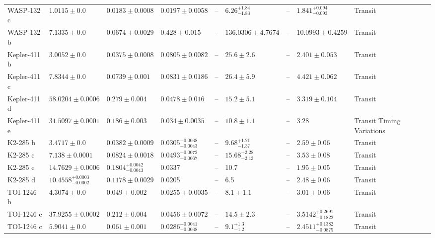 \begin{tabular}{llllllllll}
WASP-132 c & $1.0115 \pm 0.0$ & $0.0183 \pm 0.0008$ & $0.0197 \pm 0.0058$ & -- & $6.26^{+1.84}_{-1.83}$ & -- & $1.841^{+0.094}_{-0.093}$ & Transit & \cite{GRIEVES_ET_AL__2025} \\
WASP-132 b & $7.1335 \pm 0.0$ & $0.0674 \pm 0.0029$ & $0.428 \pm 0.015$ & -- & $136.0306 \pm 4.7674$ & -- & $10.0993 \pm 0.4259$ & Transit & \cite{GRIEVES_ET_AL__2025} \\
Kepler-411 b & $3.0052 \pm 0.0$ & $0.0375 \pm 0.0008$ & $0.0805 \pm 0.0082$ & -- & $25.6 \pm 2.6$ & -- & $2.401 \pm 0.053$ & Transit & \cite{SUN_ET_AL__2019} \\
Kepler-411 c & $7.8344 \pm 0.0$ & $0.0739 \pm 0.001$ & $0.0831 \pm 0.0186$ & -- & $26.4 \pm 5.9$ & -- & $4.421 \pm 0.062$ & Transit & \cite{SUN_ET_AL__2019} \\
Kepler-411 d & $58.0204 \pm 0.0006$ & $0.279 \pm 0.004$ & $0.0478 \pm 0.016$ & -- & $15.2 \pm 5.1$ & -- & $3.319 \pm 0.104$ & Transit & \cite{SUN_ET_AL__2019} \\
Kepler-411 e & $31.5097 \pm 0.0001$ & $0.186 \pm 0.003$ & $0.034 \pm 0.0035$ & -- & $10.8 \pm 1.1$ & -- & 3.28 & Transit Timing Variations & \cite{SUN_ET_AL__2019} \\
K2-285 b & $3.4717 \pm 0.0$ & $0.0382 \pm 0.0009$ & $0.0305^{+0.0038}_{-0.0043}$ & -- & $9.68^{+1.21}_{-1.37}$ & -- & $2.59 \pm 0.06$ & Transit & \cite{PALLE_ET_AL__2019} \\
K2-285 c & $7.138 \pm 0.0001$ & $0.0824 \pm 0.0018$ & $0.0493^{+0.0072}_{-0.0067}$ & -- & $15.68^{+2.28}_{-2.13}$ & -- & $3.53 \pm 0.08$ & Transit & \cite{PALLE_ET_AL__2019} \\
K2-285 e & $14.7629 \pm 0.0006$ & $0.1804^{+0.0042}_{-0.0043}$ & 0.0337 & -- & 10.7 & -- & $1.95 \pm 0.05$ & Transit & \cite{PALLE_ET_AL__2019} \\
K2-285 d & $10.4558^{+0.0003}_{-0.0002}$ & $0.1178 \pm 0.0029$ & 0.0205 & -- & 6.5 & -- & $2.48 \pm 0.06$ & Transit & \cite{PALLE_ET_AL__2019} \\
TOI-1246 b & $4.3074 \pm 0.0$ & $0.049 \pm 0.002$ & $0.0255 \pm 0.0035$ & -- & $8.1 \pm 1.1$ & -- & $3.01 \pm 0.06$ & Transit & \cite{TURTELBOOM_ET_AL_2022} \\
TOI-1246 e & $37.9255 \pm 0.0002$ & $0.212 \pm 0.004$ & $0.0456 \pm 0.0072$ & -- & $14.5 \pm 2.3$ & -- & $3.5142^{+0.2691}_{-0.1822}$ & Transit & \cite{POLANSKI_ET_AL__2024} \\
TOI-1246 c & $5.9041 \pm 0.0$ & $0.061 \pm 0.001$ & $0.0286^{+0.0041}_{-0.0038}$ & -- & $9.1^{+1.3}_{-1.2}$ & -- & $2.4511^{+0.1382}_{-0.0875}$ & Transit & \cite{POLANSKI_ET_AL__2024} \\

\end{tabular}
